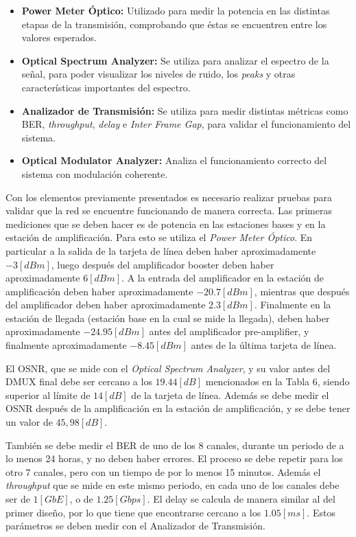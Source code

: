 \documentclass[letterpaper,11pt]{article} %
\begin{document}
\begin{itemize}
    \item \textbf{Power Meter Óptico: }Utilizado para medir la potencia en las distintas etapas de la transmisión, comprobando que éstas se encuentren entre los valores esperados.
    \item \textbf{Optical Spectrum Analyzer: }Se utiliza para analizar el espectro de la señal, para poder visualizar los niveles de ruido, los \textit{peaks} y otras características importantes del espectro.
    \item \textbf{Analizador de Transmisión: }Se utiliza para medir distintas métricas como BER, \textit{throughput}, \textit{delay} e \textit{Inter Frame Gap}, para validar el funcionamiento del sistema.
    \item \textbf{Optical Modulator Analyzer: }Analiza el funcionamiento correcto del sistema con modulación coherente.
\end{itemize}

\newp
Con los elementos previamente presentados es necesario realizar pruebas para validar que la red se encuentre funcionando de manera correcta. Las primeras mediciones que se deben hacer es de potencia en las estaciones bases y en la estación de amplificación. Para esto se utiliza el \textit{Power Meter Óptico}. En particular a la salida de la tarjeta de línea deben haber aproximadamente $-3[dBm]$, luego después del amplificador booster deben haber aproximadamente $6[dBm]$. A la entrada del amplificador en la estación de amplificación deben haber aproximadamente $-20.7[dBm]$, mientras que después del amplificador deben haber aproximadamente $2.3[dBm]$. Finalmente en la estación de llegada (estación base en la cual se mide la llegada), deben haber aproximadamente $-24.95[dBm]$ antes del amplificador pre-amplifier, y finalmente aproximadamente $-8.45[dBm]$ antes de la última tarjeta de línea.

\newp
El OSNR, que se mide con el \textit{Optical Spectrum Analyzer}, y su valor antes del DMUX final debe ser cercano a los $19.44[dB]$ mencionados en la Tabla 6, siendo superior al límite de $14[dB]$ de la tarjeta de línea. Además se debe medir el OSNR después de la amplificación en la estación de amplificación, y se debe tener un valor de $45,98[dB]$. 

\newp
También se debe medir el BER de uno de los 8 canales, durante un periodo de a lo menos 24 horas, y no deben haber errores. El proceso se debe repetir para los otro 7 canales, pero con un tiempo de por lo menos 15 minutos. Además el \textit{throughput} que se mide en este mismo periodo, en cada uno de los canales debe ser de $1[GbE]$, o de $1.25[Gbps]$. El delay se calcula de manera similar al del primer diseño, por lo que tiene que encontrarse cercano a los $1.05[ms]$. Estos parámetros se deben medir con el Analizador de Transmisión. 
\end{document}

